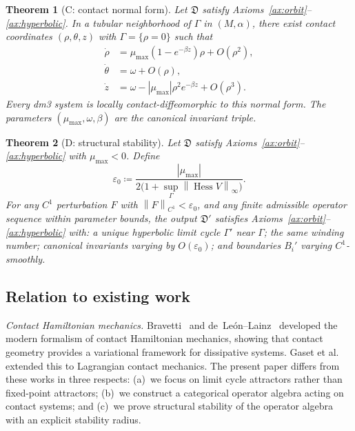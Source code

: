 \documentclass[12pt, oneside]{book}
\theoremstyle{plain}
\newtheorem{theorem}{Theorem}[section]
\theoremstyle{definition}
\theoremstyle{remark}
\newcommand{\dm}{\mathfrak{D}}
\newcommand{\Orb}{\Gamma}
\newcommand{\norm}[1]{\left\|#1\right\|}
\newcommand{\abs}[1]{\left|#1\right|}
\DeclareMathOperator{\Hess}{Hess}
\begin{document}
\begin{theorem}[C: contact normal form]\label{thm:C}
Let $\dm$ satisfy Axioms~\ref{ax:orbit}--\ref{ax:hyperbolic}. In a tubular
neighborhood of $\Orb$ in $(M,\alpha)$, there exist contact coordinates
$(\rho,\theta,z)$ with $\Orb=\{\rho=0\}$ such that
\begin{align*}
  \dot\rho &= \mu_{\max}(1-e^{-\beta z})\rho + O(\rho^2),\\
  \dot\theta &= \omega + O(\rho),\\
  \dot z &= \omega - \abs{\mu_{\max}}\rho^2 e^{-\beta z} + O(\rho^3).
\end{align*}
Every dm3 system is locally contact-diffeomorphic to this normal form.
The parameters $(\mu_{\max},\omega,\beta)$ are the canonical invariant
triple.
\end{theorem}

\begin{theorem}[D: structural stability]\label{thm:D}
Let $\dm$ satisfy Axioms~\ref{ax:orbit}--\ref{ax:hyperbolic} with
$\mu_{\max}<0$. Define
\[
  \varepsilon_0 \coloneqq
  \frac{\abs{\mu_{\max}}}{2\bigl(1+\sup_{\Orb}\norm{\Hess V}_\infty\bigr)}.
\]
For any $C^1$ perturbation $F$ with $\norm{F}_{C^1}<\varepsilon_0$, and
any finite admissible operator sequence within parameter bounds, the output
$\dm'$ satisfies Axioms~\ref{ax:orbit}--\ref{ax:hyperbolic} with: a unique
hyperbolic limit cycle $\Orb'$ near $\Orb$; the same winding number;
canonical invariants varying by $O(\varepsilon_0)$; and boundaries $B_i'$
varying $C^1$-smoothly.
\end{theorem}

\subsection{Relation to existing work}\label{sec:related}

\emph{Contact Hamiltonian mechanics.}
Bravetti~\cite{Bravetti2017} and de~Le\'on--Lainz~\cite{deLeonLainz2019}
developed the modern formalism of contact Hamiltonian mechanics, showing
that contact geometry provides a variational framework for dissipative
systems. Gaset et al.~\cite{Gaset2020} extended this to Lagrangian
contact mechanics. The present paper differs from these works in three
respects: (a)~we focus on limit cycle attractors rather than fixed-point
attractors; (b)~we construct a categorical operator algebra acting on
contact systems; and (c)~we prove structural stability of the operator
algebra with an explicit stability radius.
\end{document}
